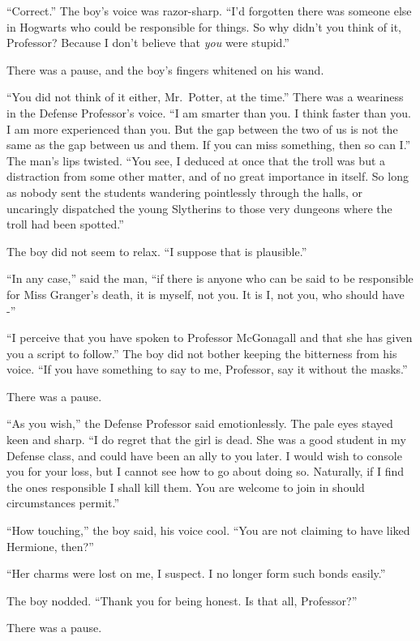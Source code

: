 ``Correct.'' The boy's voice was razor-sharp. ``I'd forgotten there was
someone else in Hogwarts who could be responsible for things. So why
didn't you think of it, Professor? Because I don't believe that
\emph{you} were stupid.''

There was a pause, and the boy's fingers whitened on his wand.

``You did not think of it either, Mr.~Potter, at the time.'' There was a
weariness in the Defense Professor's voice. ``I am smarter than you. I
think faster than you. I am more experienced than you. But the gap
between the two of us is not the same as the gap between us and them. If
you can miss something, then so can I.'' The man's lips twisted. ``You
see, I deduced at once that the troll was but a distraction from some
other matter, and of no great importance in itself. So long as nobody
sent the students wandering pointlessly through the halls, or uncaringly
dispatched the young Slytherins to those very dungeons where the troll
had been spotted.''

The boy did not seem to relax. ``I suppose that is plausible.''

``In any case,'' said the man, ``if there is anyone who can be said to
be responsible for Miss Granger's death, it is myself, not you. It is I,
not you, who should have -''

``I perceive that you have spoken to Professor McGonagall and that she
has given you a script to follow.'' The boy did not bother keeping the
bitterness from his voice. ``If you have something to say to me,
Professor, say it without the masks.''

There was a pause.

``As you wish,'' the Defense Professor said emotionlessly. The pale eyes
stayed keen and sharp. ``I do regret that the girl is dead. She was a
good student in my Defense class, and could have been an ally to you
later. I would wish to console you for your loss, but I cannot see how
to go about doing so. Naturally, if I find the ones responsible I shall
kill them. You are welcome to join in should circumstances permit.''

``How touching,'' the boy said, his voice cool. ``You are not claiming
to have liked Hermione, then?''

``Her charms were lost on me, I suspect. I no longer form such bonds
easily.''

The boy nodded. ``Thank you for being honest. Is that all, Professor?''

There was a pause.

